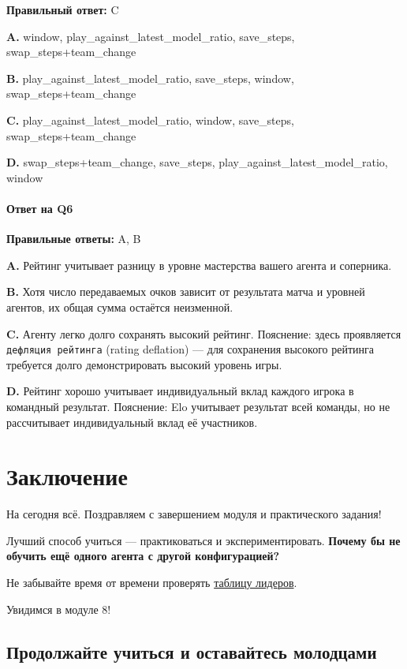 \documentclass[11pt,a4paper]{article}
\begin{document}
\textbf{Правильный ответ:} C

\textbf{A.} window, play\_against\_latest\_model\_ratio, save\_steps, swap\_steps+team\_change

\textbf{B.} play\_against\_latest\_model\_ratio, save\_steps, window, swap\_steps+team\_change

\textbf{C.} play\_against\_latest\_model\_ratio, window, save\_steps, swap\_steps+team\_change

\textbf{D.} swap\_steps+team\_change, save\_steps, play\_against\_latest\_model\_ratio, window

\paragraph{Ответ на Q6}

\textbf{Правильные ответы:} A, B

\textbf{A.} Рейтинг учитывает разницу в уровне мастерства вашего агента и соперника.

\textbf{B.} Хотя число передаваемых очков зависит от результата матча и уровней агентов, их общая сумма остаётся неизменной.

\textbf{C.} Агенту легко долго сохранять высокий рейтинг. Пояснение: здесь проявляется \texttt{дефляция\ рейтинга} (rating deflation) --- для сохранения высокого рейтинга требуется долго демонстрировать высокий уровень игры.

\textbf{D.} Рейтинг хорошо учитывает индивидуальный вклад каждого игрока в командный результат. Пояснение: Elo учитывает результат всей команды, но не рассчитывает индивидуальный вклад её участников.

\section{Заключение}\label{conclusion}

На сегодня всё. Поздравляем с завершением модуля и практического задания!

Лучший способ учиться --- практиковаться и экспериментировать. \textbf{Почему бы не обучить ещё одного агента с другой конфигурацией?}

Не забывайте время от времени проверять \href{https://huggingface.co/spaces/huggingface-projects/AIvsAI-SoccerTwos}{таблицу лидеров}.

Увидимся в модуле 8!

\subsection{Продолжайте учиться и оставайтесь молодцами}\label{keep-learning-stay-awesome}
\end{document}
